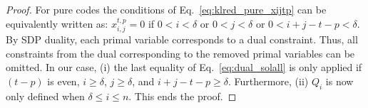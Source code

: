 \documentclass[10pt,a4paper]{amsart}
\begin{document}
\begin{proof}
For pure codes the conditions of Eq.~\eqref{eq:klred_pure_xijtp} can be equivalently written as: $x^{t,p}_{i,j} = 0$ if $0<i<\delta$ or $0<j<\delta$ or $0<i+j-t-p<\delta$. 
% 
By SDP duality, each primal variable corresponds to a dual constraint.
% 
Thus, all constraints from the dual corresponding to the removed primal variables can be omitted. 
% 
In our case, (i) the last equality of Eq.~\eqref{eq:dual_solall} is only applied if $(t-p)$ is even, $i\geq \delta$, $j\geq \delta$, and $i+j-t-p\geq \delta$.
% 
Furthermore, (ii) $Q_i$ is now only defined when $\delta \leq i \leq n$.  This ends the proof.
\end{proof}
\end{document}
